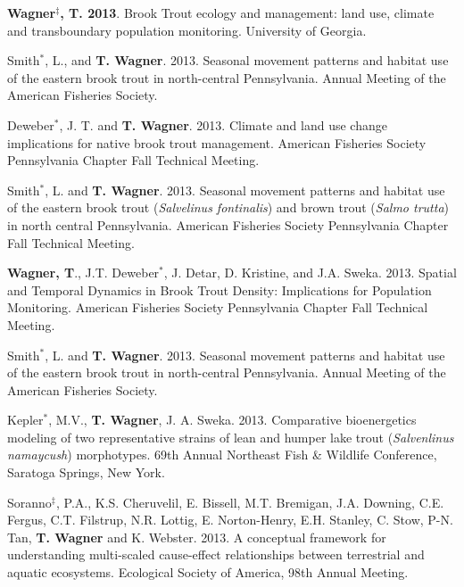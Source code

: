 \documentclass[10pt]{article}
\begin{document}
\begin{flushleft}
\begin{etaremune}
\item {\bf Wagner$^\ddagger$, T. 2013}. Brook Trout ecology and management: land use, climate and transboundary population monitoring. University of Georgia. 

\item Smith$^*$, L., and {\bf T. Wagner}. 2013. Seasonal movement patterns and habitat use of the eastern brook trout in north-central Pennsylvania. Annual Meeting of the American Fisheries Society. 

\item Deweber$^*$, J. T. and {\bf T. Wagner}. 2013. Climate and land use change implications for native brook trout management. American Fisheries Society Pennsylvania Chapter Fall Technical Meeting.

\item Smith$^*$, L. and {\bf T. Wagner}. 2013. Seasonal movement patterns and habitat use of the eastern brook trout (\emph{Salvelinus fontinalis}) and brown trout (\emph{Salmo trutta}) in north central Pennsylvania. American Fisheries Society Pennsylvania Chapter Fall Technical Meeting. 

\item {\bf Wagner, T}., J.T. Deweber$^*$, J. Detar, D. Kristine, and J.A. Sweka. 2013. Spatial and Temporal Dynamics in Brook Trout Density: Implications for Population Monitoring. American Fisheries Society Pennsylvania Chapter Fall Technical Meeting.

\item Smith$^*$, L. and {\bf T. Wagner}. 2013. Seasonal movement patterns and habitat use of the eastern brook trout in north-central Pennsylvania. Annual Meeting of the American Fisheries Society.

\item Kepler$^*$, M.V.,  {\bf T. Wagner}, J. A. Sweka. 2013. Comparative bioenergetics modeling of two representative strains of lean and humper lake trout (\emph{Salvenlinus namaycush}) morphotypes. 69th Annual Northeast Fish \& Wildlife Conference, Saratoga Springs, New York. 

\item Soranno$^\ddagger$, P.A., K.S. Cheruvelil, E. Bissell, M.T. Bremigan, J.A. Downing, C.E. Fergus, C.T. Filstrup, N.R. Lottig, E. Norton-Henry, E.H. Stanley, C. Stow, P-N. Tan, {\bf T. Wagner} and K. Webster. 2013. A conceptual framework for understanding multi-scaled cause-effect relationships between terrestrial and aquatic ecosystems. Ecological Society of America, 98th Annual Meeting.


\end{etaremune}
\end{flushleft}
\end{document}

